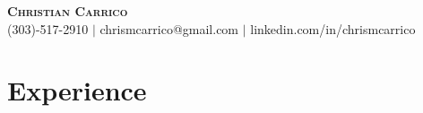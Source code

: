 \documentclass[letterpaper,11pt]{article}
\begin{document}

\begin{center}
    \textbf{\Huge \scshape Christian Carrico} \\ \vspace{1pt}
    \small
    \faMobile \hspace{.5pt} (303)-517-2910
    $|$
    \faAt \hspace{.5pt} chrismcarrico@gmail.com
    $|$
    \faLinkedinSquare \hspace{.5pt} linkedin.com/in/chrismcarrico
\end{center}


\section{Experience}
\vspace{2pt}
\end{document}
